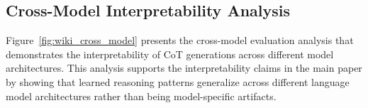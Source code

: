 \documentclass{article} %
\begin{document}
% 

\subsection{Cross-Model Interpretability Analysis}
Figure~\ref{fig:wiki_cross_model} presents the cross-model evaluation analysis that demonstrates the interpretability of CoT generations across different model architectures. This analysis supports the interpretability claims in the main paper by showing that learned reasoning patterns generalize across different language model architectures rather than being model-specific artifacts.
\end{document}
